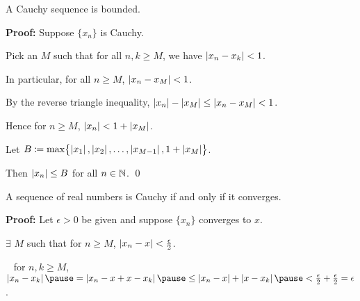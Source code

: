 \documentclass[10pt,aspectratio=149]{beamer}
\begin{document}
\begin{frame}

\begin{proposition}
A Cauchy sequence is bounded.
\end{proposition}

\pause
\textbf{Proof:}
Suppose $\{ x_n \}$ is Cauchy.

\pause
\medskip

Pick an $M$ such that for all
$n,k \geq M$, we have $\left\lvert {x_n-x_k} \right\rvert < 1$.

\pause
\medskip

In particular, 
for all $n \geq M$, \quad
$\left\lvert {x_n - x_M} \right\rvert < 1$.

\pause
By the reverse triangle inequality, \quad
$\left\lvert {x_n} \right\rvert - \left\lvert {x_M} \right\rvert \leq \left\lvert {x_n - x_M} \right\rvert < 1$.

\pause
\medskip

Hence for $n \geq M$, \quad
$\left\lvert {x_n} \right\rvert < 1 + \left\lvert {x_M} \right\rvert$.

\pause
\medskip

Let
$B \coloneqq \max \bigl\{ \left\lvert {x_1} \right\rvert, \left\lvert {x_2} \right\rvert, \ldots, \left\lvert {x_{M-1}} \right\rvert, 1+ \left\lvert {x_M} \right\rvert
\bigr\}$.

\pause
\medskip

Then $\left\lvert {x_n} \right\rvert \leq B$ for all $n \in {\mathbb{N}}$.
\qed
\end{frame}

\begin{frame}

\begin{theorem}
A sequence of real numbers is Cauchy if and only if it converges.
\end{theorem}

\pause
\textbf{Proof:}
Let $\epsilon > 0$ be given and
suppose $\{ x_n \}$ converges to $x$.

\pause
$\exists$ $M$ such that for $n \geq M$, \quad
$\left\lvert {x_n - x} \right\rvert < \frac{\epsilon}{2}$.

\pause
\medskip

\thus ~ for $n,k \geq M$,
\quad
$\abs{x_n - x_k}
\pause
= 
\abs{x_n - x + x - x_k}
\pause
\leq \abs{x_n-x} + \abs{x-x_k}
\pause
< \frac{\epsilon}{2} + \frac{\epsilon}{2} = \epsilon$.

\end{frame}
\end{document}
